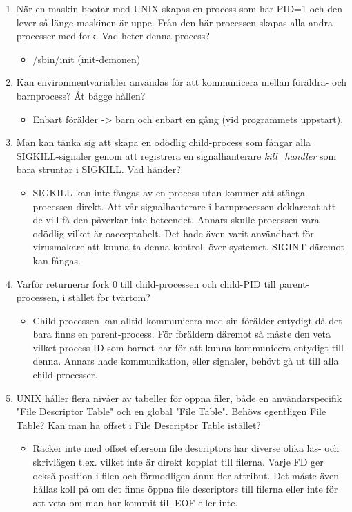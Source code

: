 \documentclass[a4paper,11pt]{article}
\begin{document}
\begin{enumerate}
	\item När en maskin bootar med UNIX skapas en process som har PID=1 och den lever så länge maskinen är uppe. Från den här processen skapas alla andra processer med fork. Vad heter denna process?
	\begin{itemize}
		\item /sbin/init (init-demonen)
	\end{itemize}
	\item Kan environmentvariabler användas för att kommunicera mellan föräldra- och barnprocess? Åt bägge hållen?
	\begin{itemize}
		\item Enbart förälder -> barn och enbart en gång (vid programmets uppstart).
	\end{itemize}
	\item Man kan tänka sig att skapa en odödlig child-process som fångar alla SIGKILL-signaler genom att registrera en signalhanterare \emph{kill\_handler} som bara struntar i SIGKILL. Vad händer?
	\begin{itemize}
		\item SIGKILL kan inte fångas av en process utan kommer att stänga processen direkt. Att vår signalhanterare i barnprocessen deklarerat att de vill få den påverkar inte beteendet. Annars skulle processen vara odödlig vilket är oacceptabelt. Det hade även varit användbart för virusmakare att kunna ta denna kontroll över systemet. SIGINT däremot kan fångas.
	\end{itemize}
	\item Varför returnerar fork 0 till child-processen och child-PID till parent-processen, i stället för tvärtom?
	\begin{itemize}
		\item Child-processen kan alltid kommunicera med sin förälder entydigt då det bara finns en parent-process. För föräldern däremot så måste den veta vilket process-ID som barnet har för att kunna kommunicera entydigt till denna. Annars hade kommunikation, eller signaler, behövt gå ut till alla child-processer.
	\end{itemize}
	\item UNIX håller flera nivåer av tabeller för öppna filer, både en användarspecifik "File Descriptor Table" och en global "File Table". Behövs egentligen File Table? Kan man ha offset i File Descriptor Table istället?
	\begin{itemize}
		\item Räcker inte med offset eftersom file descriptors har diverse olika läs- och skrivlägen t.ex. vilket inte är direkt kopplat till filerna. Varje FD ger också position i filen och förmodligen ännu fler attribut. Det måste även hållas koll på om det finns öppna file descriptors till filerna eller inte för att veta om man har kommit till EOF eller inte.

\end{itemize}
\end{enumerate}
\end{document}
